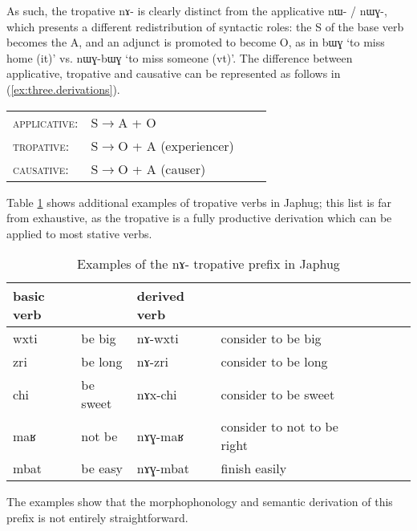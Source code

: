 \documentclass[oldfontcommands,twoside,a4paper,12pt]{article}
\newcommand{\ipa}[1]{{\phon \mbox{#1}}} %
\begin{document}
As such, the tropative \ipa{nɤ-} is clearly  distinct from the applicative \ipa{nɯ-} / \ipa{nɯɣ-}, which presents a different redistribution of syntactic roles: the S of the base verb becomes the A, and an adjunct is promoted to become O, as in \ipa{bɯɣ} `to miss home (it)' vs. \ipa{nɯɣ-bɯɣ} `to miss someone (vt)'. The difference between applicative, tropative and causative can be represented as follows in (\ref{ex:three.derivations}).
  \begin{exe}
  \ex \label{ex:three.derivations}
\glt \begin{tabular}{llll}
 \textsc{applicative}: &S$\rightarrow$A + O\\
  \textsc{tropative}: &S$\rightarrow$O + A (experiencer)\\
 \textsc{causative}: &S$\rightarrow$O + A (causer)\\
\end{tabular}
\end{exe} 
Table \ref{tab:tropative}  shows additional examples of tropative verbs in Japhug; this list is far from exhaustive, as the tropative is a fully productive derivation which can be applied to most stative verbs.

\begin{table}[h]
\caption{Examples of the \ipa{nɤ}- tropative prefix in Japhug}\label{tab:tropative} \centering
\begin{tabular}{lllllllll} \toprule 
basic verb  & &derived  verb &\\
\midrule
 \ipa{wxti} & be big & \ipa{nɤ-wxti} & consider to be  big \\
 \ipa{zri} & be long & \ipa{nɤ-zri} & consider to be  long \\
       \midrule
  \ipa{chi} &be sweet & \ipa{nɤx-chi}  &consider to be  sweet \\
  \ipa{maʁ} & not be & \ipa{nɤɣ-maʁ} & consider to not to be right \\
  \ipa{mbat} & be easy & \ipa{nɤɣ-mbat} & finish easily \\
\bottomrule
\end{tabular}
\end{table}
The examples show that the morphophonology and semantic derivation of this prefix is not entirely straightforward.
\end{document}
